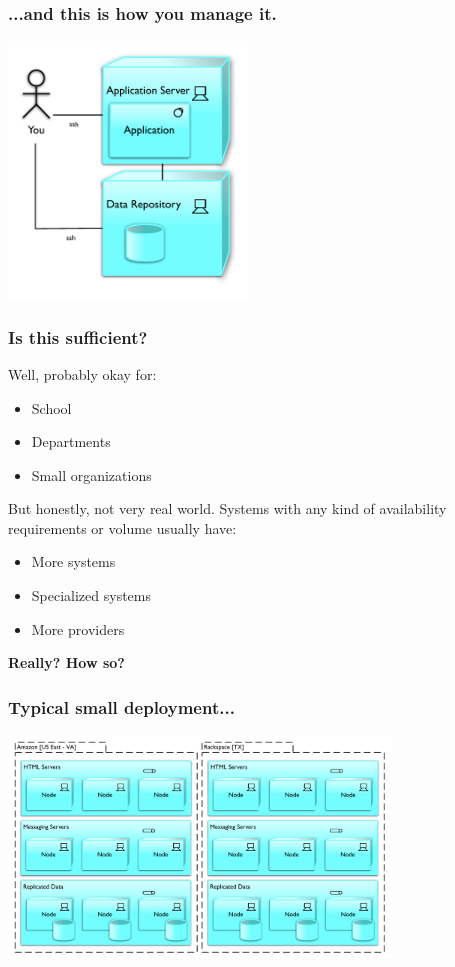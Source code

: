 \documentclass[t,handout]{beamer}
\begin{document}
\begin{frame}
\frametitle{...and this is how you manage it.}
\begin{center}
\includegraphics[width = 2.5in]{cap-stack-you.pdf}
\end{center}
\transfade
\end{frame}

\begin{frame}
\frametitle{Is this sufficient?}
Well, probably okay for:
\begin{small}
\begin{itemize}
\item School
\item Departments
\item Small organizations
\end{itemize}
\end{small}
But honestly, not very real world.  Systems with any kind of availability requirements or volume usually have:
\begin{small}
\begin{itemize}
\item More systems
\item Specialized systems
\item More providers
\end{itemize}
\end{small}
\begin{center}
{\bf Really? How so?}
\end{center}
\end{frame}

\begin{frame}
\frametitle{Typical small deployment...}
\begin{center}
\includegraphics[width = 4in]{cap-distributed.pdf}
\end{center}
\transfade
\end{frame}
\end{document}
